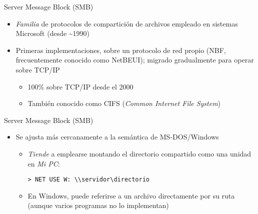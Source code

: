 \documentclass[presentation]{beamer}
\newcommand{\rarrow}{$\rightarrow$\hskip 0.5em}
\begin{document}

\begin{frame}[label={sec:org018f3ad}]{Server Message Block (SMB)}
\begin{itemize}
\item \emph{Familia} de protocolos de compartición de archivos empleado en
sistemas Microsoft (desde \textasciitilde{}1990)
\item Primeras implementaciones, sobre un protocolo de red propio (NBF,
frecuentemente conocido como NetBEUI); migrado gradualmente para
operar sobre TCP/IP
\begin{itemize}
\item 100\% sobre TCP/IP desde el 2000
\item También conocido como CIFS (\emph{Common Internet File System})
\end{itemize}
\end{itemize}
\end{frame}

\begin{frame}[label={sec:orgc314791},fragile]{Server Message Block (SMB)}
 \begin{itemize}
\item Se ajusta más cercanamente a la semántica de MS-DOS/Windows
\begin{itemize}
\item \emph{Tiende} a emplearse montando el directorio compartido como una
unidad en \emph{Mi PC}:

\texttt{> NET USE W: \textbackslash{}\textbackslash{}servidor\textbackslash{}directorio}
\item En Windows, puede referirse a un archivo directamente por su ruta
(aunque varios programas no lo implementan)
\end{itemize}
\end{itemize}
\end{frame}
\end{document}

